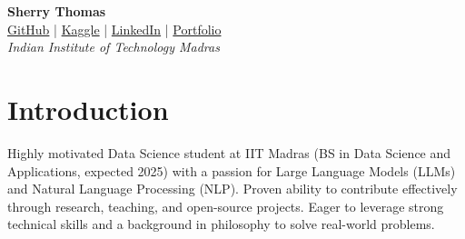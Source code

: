 \documentclass[a4paper,10pt]{article}
\begin{document}
\pagestyle{empty}

\begin{center}
    \textbf{{\LARGE Sherry Thomas}} \\
    \href{https://github.com/SherryS997}{GitHub} | \href{https://www.kaggle.com/iveeaten3223times}{Kaggle} | \href{https://www.linkedin.com/in/sherry-thomassp/}{LinkedIn} | \href{https://sherrys997.github.io/}{Portfolio} \\
    \textit{Indian Institute of Technology Madras}
\end{center}

\section*{Introduction}
Highly motivated Data Science student at IIT Madras (BS in Data Science and Applications, expected 2025) with a passion for Large Language Models (LLMs) and Natural Language Processing (NLP). Proven ability to contribute effectively through research, teaching, and open-source projects. Eager to leverage strong technical skills and a background in philosophy to solve real-world problems.
\end{document}
